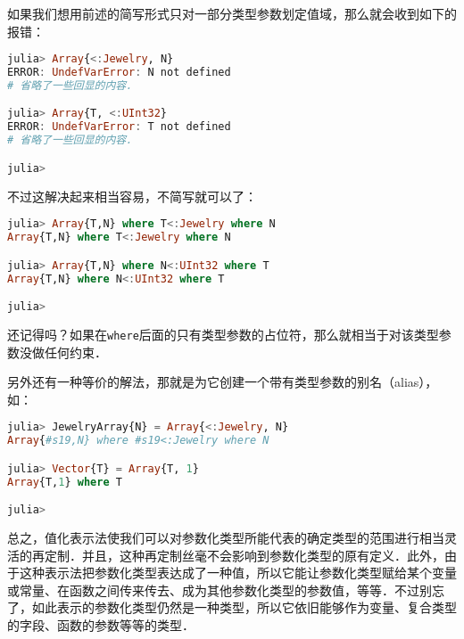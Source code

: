如果我们想用前述的简写形式只对一部分类型参数划定值域，那么就会收到如下的报错：
\begin{lstlisting}[language=julia]
julia> Array{<:Jewelry, N}
ERROR: UndefVarError: N not defined
# 省略了一些回显的内容．

julia> Array{T, <:UInt32}
ERROR: UndefVarError: T not defined
# 省略了一些回显的内容．

julia>  
\end{lstlisting}

不过这解决起来相当容易，不简写就可以了：
\begin{lstlisting}[language=julia]
julia> Array{T,N} where T<:Jewelry where N
Array{T,N} where T<:Jewelry where N

julia> Array{T,N} where N<:UInt32 where T
Array{T,N} where N<:UInt32 where T

julia> 
\end{lstlisting}

还记得吗？如果在\verb|where|后面的只有类型参数的占位符，那么就相当于对该类型参数没做任何约束．

另外还有一种等价的解法，那就是为它创建一个带有类型参数的别名（alias），如：
\begin{lstlisting}[language=julia]
julia> JewelryArray{N} = Array{<:Jewelry, N}
Array{#s19,N} where #s19<:Jewelry where N

julia> Vector{T} = Array{T, 1}
Array{T,1} where T

julia> 
\end{lstlisting}

总之，值化表示法使我们可以对参数化类型所能代表的确定类型的范围进行相当灵活的再定制．并且，这种再定制丝毫不会影响到参数化类型的原有定义．此外，由于这种表示法把参数化类型表达成了一种值，所以它能让参数化类型赋给某个变量或常量、在函数之间传来传去、成为其他参数化类型的参数值，等等．不过别忘了，如此表示的参数化类型仍然是一种类型，所以它依旧能够作为变量、复合类型的字段、函数的参数等等的类型．